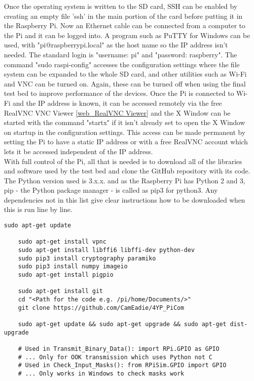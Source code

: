 \documentclass[../main.tex]{subfiles}
\begin{document}
Once the operating system is written to the SD card, SSH can be enabled by creating an empty file 'ssh' in the main portion of the card before putting it in the Raspberry Pi.
Now an Ethernet cable can be connected from a computer to the Pi and it can be logged into.
A program such as PuTTY for Windows can be used, with "pi@raspberrypi.local" as the host name so the IP address isn't needed.
The standard login is "username: pi" and "password: raspberry".
The command "sudo raspi-config" accesses the configuration settings where the file system can be expanded to the whole SD card, and other utilities such as Wi-Fi and VNC can be turned on.
Again, these can be turned off when using the final test bed to improve performance of the devices.
Once the Pi is connected to Wi-Fi and the IP address is known, it can be accessed remotely via the free RealVNC VNC Viewer \ref{web_RealVNC Viewer} and the X Window can be started with the command "startx" if it isn't already set to open the X Window on startup in the configuration settings.
This access can be made permanent by setting the Pi to have a static IP address or with a free RealVNC account which lets it be accessed independent of the IP address.\\

With full control of the Pi, all that is needed is to download all of the libraries and software used by the test bed and clone the GitHub repository with its code.
The Python version used is 3.x.x.
and as the Raspberry Pi has Python 2 and 3, pip - the Python package manager - is called as pip3 for python3.
Any dependencies not in this list give clear instructions how to be downloaded when this is run line by line.\\

\lstset{style=python}
\begin{lstlisting}[caption=Libraries and Packages Required for the Test Bed]
	sudo apt-get update
	
	sudo apt-get install vpnc
	sudo apt-get install libffi6 libffi-dev python-dev
	sudo pip3 install cryptography paramiko
	sudo pip3 install numpy imageio
	sudo apt-get install pigpio
	
	sudo apt-get install git
	cd "<Path for the code e.g. /pi/home/Documents/>"
	git clone https://github.com/CamEadie/4YP_PiCom
	
	sudo apt-get update && sudo apt-get upgrade && sudo apt-get dist-upgrade

	# Used in Transmit_Binary_Data(): import RPi.GPIO as GPIO
	# ... Only for OOK transmission which uses Python not C
	# Used in Check_Input_Masks(): from RPiSim.GPIO import GPIO
	# ... Only works in Windows to check masks work
\end{lstlisting}
\end{document}
